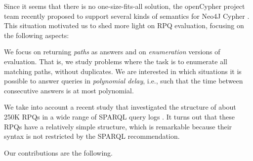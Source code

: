 \documentclass[a4paper,english]{lipics-v2016}
\theoremstyle{plain}
\begin{document}
Since it seems that there is no one-size-fits-all solution, the
openCypher project team recently proposed to support several kinds of
semantics for Neo4J Cypher
\cite{CIP17}. This situation motivated us to shed more light on RPQ evaluation, focusing on the
following aspects:
\begin{compactitem}
\item We focus on returning \emph{paths} as answers and on
  \emph{enumeration} versions of evaluation. That is, we study
  problems where the task is to enumerate all matching paths, without
  duplicates. We are interested in which situations it is possible to
  answer queries in \emph{polynomial delay}, i.e., such that the time
  between consecutive answers is at most polynomial.
\item We take into account a recent study 
  that investigated the structure of about 250K RPQs in a wide range
  of SPARQL query logs \cite{BonifatiMT-corr17}. It turns out that these RPQs have a
  relatively simple structure, which is remarkable because their syntax
  is not restricted by the SPARQL recommendation.
\end{compactitem}
Our contributions are the following. 
\end{document}
